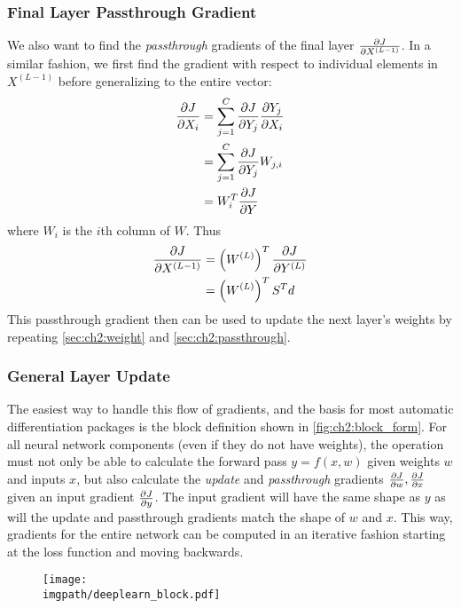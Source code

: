 \subsubsection{Final Layer Passthrough Gradient} \label{sec:ch2:passthrough}
We also want to find the \emph{passthrough} gradients of the final
layer $\frac{\partial J}{\partial X^{(L-1)}}$. In a similar fashion, we first find the gradient
with respect to individual elements in $X^{(L-1)}$ before generalizing to the
entire vector:
\begin{align}
  \frac{\partial J}{\partial X_i} &= \sum_{j=1}^{C} \frac{\partial J}{\partial Y_j} \frac{\partial Y_j}{\partial X_i} \\
                &= \sum_{j=1}^{C} \frac{\partial J}{\partial Y_j} W_{j,i} \\
                &= W_{i}^T\frac{\partial J}{\partial Y} \\
\end{align}
where $W_i$ is the $i$th column of $W$. Thus
\begin{align}
  \frac{\partial J}{\partial X^{(L-1)}} &= \left(W^{(L)}\right)^T \frac{\partial J}{\partial Y^{(L)}} \\
                      &= \left( W^{(L)} \right)^T S^T d
\end{align}
This passthrough gradient then can be used to update the next layer's weights by
repeating \autoref{sec:ch2:weight} and \autoref{sec:ch2:passthrough}.

\subsubsection{General Layer Update}
The easiest way to handle this flow of gradients, and the basis for most
automatic differentiation packages is the block definition shown in
\autoref{fig:ch2:block_form}. For all neural network components (even if they do
not have weights), the operation must not only be able to calculate the forward 
pass $y=f(x, w)$ given weights $w$ and inputs $x$, but also calculate the
\emph{update} and \emph{passthrough} gradients $\frac{\partial J}{\partial w}, \frac{\partial J}{\partial x}$ given
an input gradient $\frac{\partial J}{\partial y}$. The input gradient will have the same shape as
$y$ as will the update and passthrough gradients match the shape of $w$ and $x$.
This way, gradients for the entire network can be computed in an iterative
fashion starting at the loss function and moving backwards.

\begin{figure}
  \centering
  \texttt{[image: \\imgpath/deeplearn\_block.pdf]}
  \label{fig:ch2:block_form}
\end{figure}

